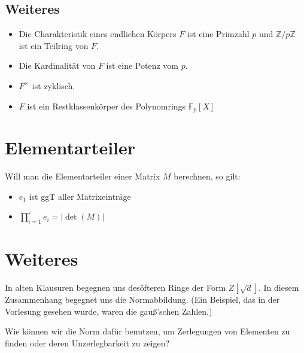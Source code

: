 \documentclass[a4paper,9pt]{scrartcl}
\begin{document}
\subsection*{Weiteres}
\begin{itemize}
	\item Die Charakteristik eines endlichen Körpers $F$ ist eine Primzahl 
          $p$ und $\mathbb{Z}/p\mathbb{Z}$ ist ein Teilring von $F$.
	\item Die Kardinalität von $F$ ist eine Potenz vom $p$.
	\item $F^\times$ ist zyklisch.
	\item $F$ ist ein Restklassenkörper des Polynomrings $\mathbb{F}_p [X]$
\end{itemize}

\section*{Elementarteiler}
Will man die Elementarteiler einer Matrix $M$ berechnen, so gilt:
\begin{itemize}
	\item $e_1$ ist ggT aller Matrixeinträge
	\item $\prod_{i=1}^r e_i = |\det(M)|$
\end{itemize}

\section*{Weiteres}
In alten Klausuren begegnen uns desöfteren Ringe der Form $Z[\sqrt{d}]$. 
In diesem Zusammenhang begegnet uns die Normabbildung. 
(Ein Beispiel, das in der Vorlesung gesehen wurde, waren die gauß'schen Zahlen.)

Wie können wir die Norm dafür benutzen, um Zerlegungen von Elementen zu finden oder deren Unzerlegbarkeit zu zeigen?
\end{document}
